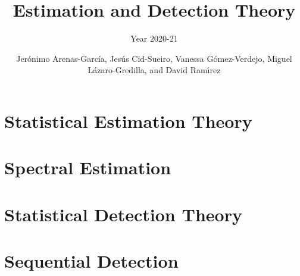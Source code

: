 \documentclass[graybox,envcountchap,sectrefs]{svmono_mod}
\begin{document}
\author{Jer\'onimo Arenas-Garc\'ia, Jes\'us Cid-Sueiro, Vanessa G\'omez-Verdejo, Miguel L\'azaro-Gredilla, and David Ram{\'\i}rez}
\title{Estimation and Detection Theory}
\subtitle{Year 2020-21}
\maketitle

\frontmatter%

%
%
%
%


\tableofcontents
%

\mainmatter%

%
\chapter{Statistical Estimation Theory}









\chapter{Spectral Estimation}


%

\chapter{Statistical Detection Theory}
\label{ch:SDT}



\chapter{Sequential Detection}
\label{sec:seq_det}

%


%


\backmatter%
%
%
\printindex
\end{document}

